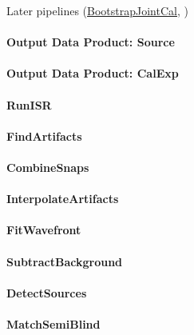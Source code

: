 Later pipelines (\hyperref[sec:drpBootstrapJointCal]{BootstrapJointCal}, )

\paragraph{Output Data Product: Source}
\label{sec:drpBootstrapImChar_sources}

\paragraph{Output Data Product: CalExp}
\label{sec:drpBootstrapImChar_calexp}

\paragraph{RunISR}
\label{sec:drpBootstrapImChar_RunISR}

\paragraph{FindArtifacts}
\label{sec:drpBootstrapImChar_FindArtifacts}

\paragraph{CombineSnaps}
\label{sec:drpBootstrapImChar_CombineSnaps}

\paragraph{InterpolateArtifacts}
\label{sec:drpBootstrapImChar_InterpolateArtifacts}

\paragraph{FitWavefront}
\label{sec:drpBootstrapImChar_FitWavefront}

\paragraph{SubtractBackground}
\label{sec:drpBootstrapImChar_SubtractBackground}

\paragraph{DetectSources}
\label{sec:drpBootstrapImChar_DetectSources}

\paragraph{MatchSemiBlind}
\label{sec:drpBootstrapImChar_MatchSemiBlind}

